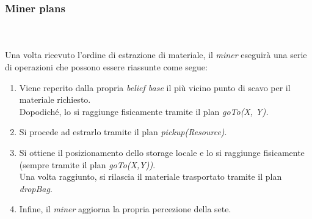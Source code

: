 \documentclass{llncs}
\begin{document}
\subsubsection{Miner plans}~\\\\
Una volta ricevuto l'ordine di estrazione di materiale, il \textit{miner} eseguirà una serie di operazioni che possono essere riassunte come segue:
\begin{enumerate}
	\item Viene reperito dalla propria \textit{belief base} il più vicino punto di scavo per il materiale richiesto.\\
	Dopodiché, lo si raggiunge fisicamente tramite il plan \textit{goTo(X, Y).}\\
	\item Si procede ad estrarlo tramite il plan \textit{pickup(Resource)}.\\
	\item Si ottiene il posizionamento dello storage locale e lo si raggiunge fisicamente (sempre tramite il plan \textit{goTo(X,Y))}.\\ 
	Una volta raggiunto, si rilascia il materiale trasportato tramite il plan \textit{dropBag}.\\
	\item Infine, il \textit{miner} aggiorna la propria percezione della sete.
\end{enumerate}

\end{document}
